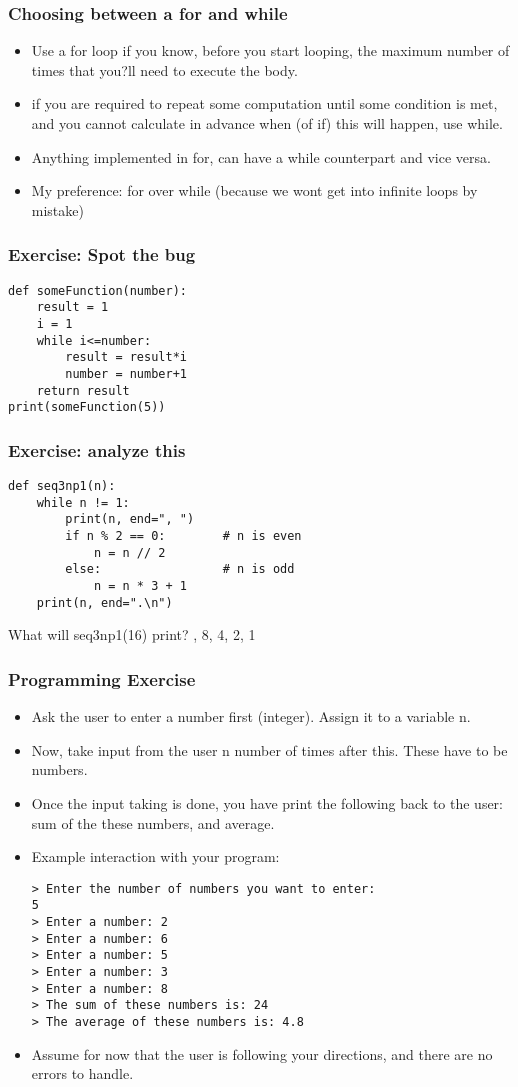 \documentclass{beamer}
\begin{document}
\begin{frame}
\frametitle{Choosing between a for and while}
\begin{itemize}
\item Use a for loop if you know, before you start looping, the maximum number of times that you?ll need to execute the body. 
\item  if you are required to repeat some computation until some condition is met, and you cannot calculate in advance when (of if) this will happen, use while.
\item Anything implemented in for, can have a while counterpart and vice versa.
\item My preference: for over while (because we wont get into infinite loops by mistake)
\end{itemize}
\end{frame}

\begin{frame}[fragile]
\frametitle{Exercise: Spot the bug}
\begin{verbatim}
def someFunction(number):
    result = 1
    i = 1
    while i<=number:
        result = result*i
        number = number+1
    return result
print(someFunction(5)) 
\end{verbatim} 
\end{frame}

\begin{frame}[fragile]
\frametitle{Exercise: analyze this}
\begin{verbatim}
def seq3np1(n):
    while n != 1:
        print(n, end=", ")
        if n % 2 == 0:        # n is even
            n = n // 2
        else:                 # n is odd
            n = n * 3 + 1
    print(n, end=".\n")
\end{verbatim}
What will seq3np1(16) print? , 8, 4, 2, 1
\end{frame}

\begin{frame}[fragile]
\frametitle{Programming Exercise}
\begin{itemize}
\item Ask the user to enter a number first (integer). Assign it to a variable n.
\item Now, take input from the user n number of times after this. These have to be numbers.
\item Once the input taking is done, you have print the following back to the user: sum of the these numbers, and average. 
\item Example interaction with your program:
\tiny
\begin{verbatim}
> Enter the number of numbers you want to enter: 
5
> Enter a number: 2
> Enter a number: 6
> Enter a number: 5
> Enter a number: 3
> Enter a number: 8
> The sum of these numbers is: 24
> The average of these numbers is: 4.8
\end{verbatim}
\small \item Assume for now that the user is following your directions, and there are no errors to handle.
\end{itemize}
\end{frame}
\end{document}
